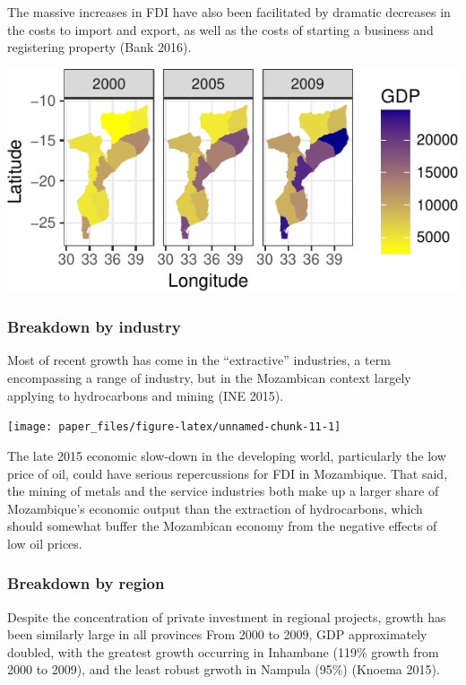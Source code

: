\documentclass[]{elsarticle} %
\begin{document}
The massive increases in FDI have also been facilitated by dramatic
decreases in the costs to import and export, as well as the costs of
starting a business and registering property (Bank 2016).

\begin{center}\includegraphics{paper_files/figure-latex/unnamed-chunk-10-1} \end{center}

\subsubsection{Breakdown by industry}\label{breakdown-by-industry}

Most of recent growth has come in the ``extractive'' industries, a term
encompassing a range of industry, but in the Mozambican context largely
applying to hydrocarbons and mining (INE 2015).

\begin{center}\texttt{[image: paper\_files/figure-latex/unnamed-chunk-11-1]} \end{center}

The late 2015 economic slow-down in the developing world, particularly
the low price of oil, could have serious repercussions for FDI in
Mozambique. That said, the mining of metals and the service industries
both make up a larger share of Mozambique's economic output than the
extraction of hydrocarbons, which should somewhat buffer the Mozambican
economy from the negative effects of low oil prices.

\subsubsection{Breakdown by region}\label{breakdown-by-region}

Despite the concentration of private investment in regional projects,
growth has been similarly large in all provinces From 2000 to 2009, GDP
approximately doubled, with the greatest growth occurring in Inhambane
(119\% growth from 2000 to 2009), and the least robust grwoth in Nampula
(95\%) (Knoema 2015).
\end{document}
